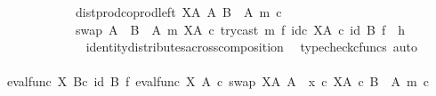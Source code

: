 \begin{isabellebody}
\ \ \ \ \ \ \ \ \ \ \ \ dist{\isacharunderscore}{\kern0pt}prod{\isacharunderscore}{\kern0pt}coprod{\isacharunderscore}{\kern0pt}left\ {\isacharparenleft}{\kern0pt}X\isactrlbsup A\isactrlesup {\isacharparenright}{\kern0pt}\ A\ {\isacharparenleft}{\kern0pt}B\ {\isasymsetminus}\ {\isacharparenleft}{\kern0pt}A{\isacharcomma}{\kern0pt}\ m{\isacharparenright}{\kern0pt}{\isacharparenright}{\kern0pt}\ {\isasymcirc}\isactrlsub c\isanewline
\ \ \ \ \ \ \ \ \ \ \ \ swap\ {\isacharparenleft}{\kern0pt}A\ {\isasymCoprod}\ {\isacharparenleft}{\kern0pt}B\ {\isasymsetminus}\ {\isacharparenleft}{\kern0pt}A{\isacharcomma}{\kern0pt}\ m{\isacharparenright}{\kern0pt}{\isacharparenright}{\kern0pt}{\isacharparenright}{\kern0pt}\ {\isacharparenleft}{\kern0pt}X\isactrlbsup A\isactrlesup {\isacharparenright}{\kern0pt}\ {\isasymcirc}\isactrlsub c\ try{\isacharunderscore}{\kern0pt}cast\ m\ {\isasymtimes}\isactrlsub f\ id\isactrlsub c\ {\isacharparenleft}{\kern0pt}X\isactrlbsup A\isactrlesup {\isacharparenright}{\kern0pt}{\isacharparenright}{\kern0pt}\isactrlsup {\isasymsharp}{\isacharparenright}{\kern0pt}{\isacharparenright}{\kern0pt}\ {\isasymcirc}\isactrlsub c\ {\isacharparenleft}{\kern0pt}id\ B\ {\isasymtimes}\isactrlsub f\ \ h{\isacharparenright}{\kern0pt}{\isachardoublequoteclose}\isanewline
\ \ \ \ \ \ \ \ \ \ \ \ \isamarkupfalse%
\ identity{\isacharunderscore}{\kern0pt}distributes{\isacharunderscore}{\kern0pt}across{\isacharunderscore}{\kern0pt}composition\ \isamarkupfalse%
\ {\isacharparenleft}{\kern0pt}typecheck{\isacharunderscore}{\kern0pt}cfuncs{\isacharcomma}{\kern0pt}\ auto{\isacharparenright}{\kern0pt}\isanewline
\ \ \ \ \ \ \ \ \ \ \isamarkupfalse%
\ \isamarkupfalse%
\ {\isachardoublequoteopen}{\isacharparenleft}{\kern0pt}{\isacharparenleft}{\kern0pt}eval{\isacharunderscore}{\kern0pt}func\ X\ B{\isacharparenright}{\kern0pt}{\isasymcirc}\isactrlsub c\ {\isacharparenleft}{\kern0pt}id\ B\ {\isasymtimes}\isactrlsub f\ {\isacharparenleft}{\kern0pt}{\isacharparenleft}{\kern0pt}{\isacharparenleft}{\kern0pt}eval{\isacharunderscore}{\kern0pt}func\ X\ A\ {\isasymcirc}\isactrlsub c\ swap\ {\isacharparenleft}{\kern0pt}X\isactrlbsup A\isactrlesup {\isacharparenright}{\kern0pt}\ A{\isacharparenright}{\kern0pt}\ {\isasymamalg}\ {\isacharparenleft}{\kern0pt}x\ {\isasymcirc}\isactrlsub c\ {\isasymbeta}\isactrlbsub X\isactrlbsup A\isactrlesup \ {\isasymtimes}\isactrlsub c\ {\isacharparenleft}{\kern0pt}B\ {\isasymsetminus}\ {\isacharparenleft}{\kern0pt}A{\isacharcomma}{\kern0pt}\ m{\isacharparenright}{\kern0pt}{\isacharparenright}{\kern0pt}\isactrlesub {\isacharparenright}{\kern0pt}\ {\isasymcirc}\isactrlsub c\isanewline

\end{isabellebody}
